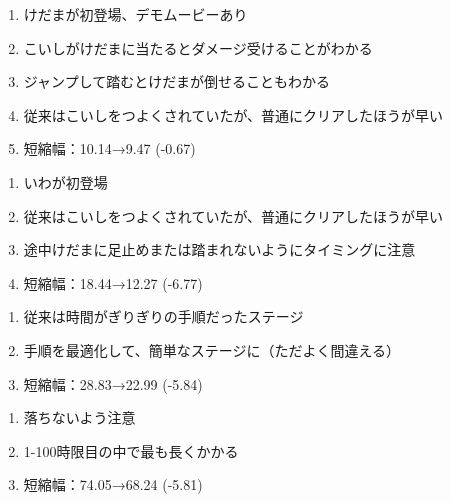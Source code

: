 \begin{enumerate}[label={\sarrow}]
\item けだまが初登場、デモムービーあり
\item こいしがけだまに当たるとダメージ受けることがわかる
\item ジャンプして踏むとけだまが倒せることもわかる
\item 従来はこいしをつよくされていたが、普通にクリアしたほうが早い
\item 短縮幅：10.14→9.47 (-0.67)
\end{enumerate}



\clearpage
\begin{enumerate}[label={\sarrow}]
\item いわが初登場
\item 従来はこいしをつよくされていたが、普通にクリアしたほうが早い
\item 途中けだまに足止めまたは踏まれないようにタイミングに注意
\item 短縮幅：18.44→12.27 (-6.77)
\end{enumerate}



\begin{enumerate}[label={\sarrow}]
\item 従来は時間がぎりぎりの手順だったステージ
\item 手順を最適化して、簡単なステージに（ただよく間違える）
\item 短縮幅：28.83→22.99 (-5.84)
\end{enumerate}



\begin{enumerate}[label={\sarrow}]
\item 落ちないよう注意
\item 1-100時限目の中で最も長くかかる
\item 短縮幅：74.05→68.24 (-5.81)
\end{enumerate}



